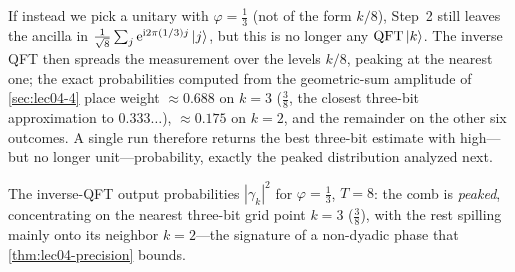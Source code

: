 \begin{remark}
\label{rem:lec04-nondyadic}
If instead we pick a unitary with $\varphi=\tfrac13$ (not of the form $k/8$),
Step~2 still leaves the ancilla in
$\tfrac{1}{\sqrt8}\sum_j\mathrm{e}^{\mathrm{i} 2\pi(1/3)j}\ket{j}$, but this is no longer any
$\mathrm{QFT}\ket{k}$. The inverse QFT then spreads the measurement over the levels
$k/8$, peaking at the nearest one; the exact probabilities computed from the
geometric-sum amplitude of \cref{sec:lec04-4} place weight $\approx0.688$ on
$k=3$ ($\tfrac38$, the closest three-bit approximation to $0.333\ldots$),
$\approx0.175$ on $k=2$, and the remainder on the other six outcomes. A single
run therefore returns the best three-bit estimate with high---but no longer
unit---probability, exactly the peaked distribution analyzed next.

\begin{center}
\end{center}
\noindent\small The inverse-QFT output probabilities $|\gamma_k|^2$ for
$\varphi=\tfrac13$, $T=8$: the comb is \emph{peaked}, concentrating on the nearest
three-bit grid point $k=3$ ($\tfrac38$), with the rest spilling mainly onto its
neighbor $k=2$---the signature of a non-dyadic phase that
\cref{thm:lec04-precision} bounds.
\end{remark}

